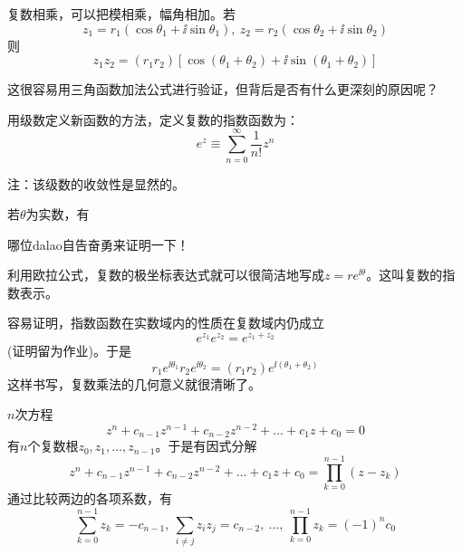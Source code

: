 \documentclass[CJK]{beamer}
\begin{document}
\begin{frame}
\bch

复数相乘，可以把模相乘，幅角相加。若
$$z_1=r_1(\cos\theta_1+\ii \sin\theta_1),\ z_2= r_2(\cos\theta_2+\ii \sin\theta_2)$$
则
$$z_1z_2 = (r_1r_2)\left[\cos(\theta_1+\theta_2) + \ii \sin(\theta_1+\theta_2)\right]$$

这很容易用三角函数加法公式进行验证，但背后是否有什么更深刻的原因呢？

\ech
\end{frame}


\begin{frame}
  \bch
  用级数定义新函数的方法，定义复数的指数函数为：
  $$ e^z\equiv \sum_{n=0}^\infty \frac{1}{n!}z^n$$

  {\scriptsize 注：该级数的收敛性是显然的。}  
  \ech
\end{frame}

\begin{frame}
\bch
若$\theta$为实数，有


哪位dalao自告奋勇来证明一下！

\ech
\end{frame}


\begin{frame}
\bch
利用欧拉公式，复数的极坐标表达式就可以很简洁地写成$z = r e^{\ii \theta}$。这叫复数的指数表示。

容易证明，指数函数在实数域内的性质在复数域内仍成立
$$ e^{z_1}e^{z_2} = e^{z_1+z_2} $$
(证明留为作业)。于是
$$r_1e^{\ii\theta_1} r_2e^{\ii \theta_2} = (r_1r_2) e^{\ii(\theta_1+\theta_2)}$$
这样书写，复数乘法的几何意义就很清晰了。

\ech
\end{frame}


\begin{frame}
\bch
$n$次方程
$$z^n + c_{n-1}z^{n-1} + c_{n-2}z^{n-2}+\ldots + c_1 z+c_0=0$$
有$n$个复数根$z_0, z_1, \ldots, z_{n-1}$。于是有因式分解
$$z^n + c_{n-1}z^{n-1} + c_{n-2}z^{n-2}+\ldots + c_1 z+c_0=\prod_{k=0}^{n-1}\left(z-z_k\right)$$
通过比较两边的各项系数，有
$$ \sum_{k=0}^{n-1}z_k = -c_{n-1},\  \sum_{i\ne j} z_iz_j = c_{n-2},\ \ldots,\ \prod_{k=0}^{n-1}z_k = (-1)^nc_0$$

\ech
\end{frame}
\end{document}
